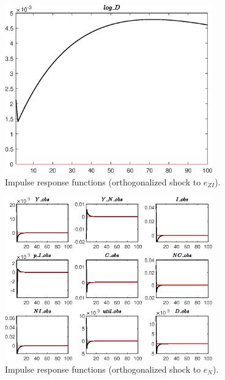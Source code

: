 \begin{figure}[H]
\centering 
\includegraphics[width=0.80\textwidth]{BRS_growth_util/graphs/BRS_growth_util_IRF_e_ZI3}
\caption{Impulse response functions (orthogonalized shock to ${e_{ZI}}$).}\label{Fig:IRF:e_ZI:3}
\end{figure}
 
\begin{figure}[H]
\centering 
\includegraphics[width=0.80\textwidth]{BRS_growth_util/graphs/BRS_growth_util_IRF_e_N1}
\caption{Impulse response functions (orthogonalized shock to ${e_N}$).}\label{Fig:IRF:e_N:1}
\end{figure}
 
